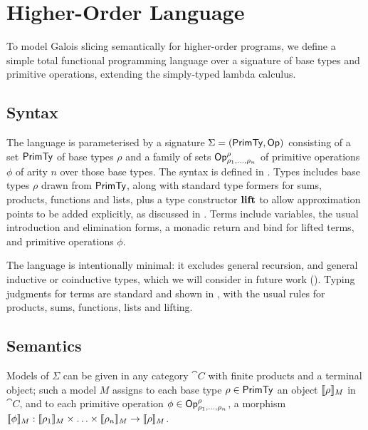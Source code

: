 \section{Higher-Order Language}
\label{sec:language}

To model Galois slicing semantically for higher-order programs, we define a simple total functional
programming language over a signature of base types and primitive operations, extending the simply-typed
lambda calculus.

\subsection{Syntax}
\label{sec:language:syntax}

The language is parameterised by a signature $\Sigma = (\mathsf{PrimTy}, \mathsf{Op})$ consisting of a set $\mathsf{PrimTy}$ of
base types $\rho$ and a family of sets $\mathsf{Op}^\rho_{\rho_1,\ldots,\rho_n}$ of primitive operations $\phi$ of
arity $n$ over those base types. The syntax is defined in . Types includes base types $\rho$
drawn from $\mathsf{PrimTy}$, along with standard type formers for sums, products, functions and lists, plus a type
constructor $\mathbf{lift}$ to allow approximation points to be added explicitly, as discussed in
. Terms include variables, the usual introduction and elimination forms, a monadic
return and bind for lifted terms, and primitive operations $\phi$.

The language is intentionally minimal: it excludes general recursion, and general inductive or coinductive
types, which we will consider in future work (). Typing judgments for terms are standard
and shown in , with the usual rules for products, sums, functions, lists and lifting.




\subsection{Semantics}
\label{sec:language:semantics}



Models of $\Sigma$ can be given in any category $\cat{C}$ with finite products and a terminal object; such a
model $M$ assigns to each base type $\rho \in \mathsf{PrimTy}$ an object $\llbracket \rho \rrbracket_{M}$ in $\cat{C}$, and to each
primitive operation $\phi \in \mathsf{Op}^\rho_{\rho_1,\ldots,\rho_n}$, a morphism $\llbracket \phi \rrbracket_{M}:
\llbracket \rho_1 \rrbracket_{M} \times \ldots \times \llbracket \rho_n \rrbracket_{M} \to \llbracket \rho \rrbracket_{M}$.

